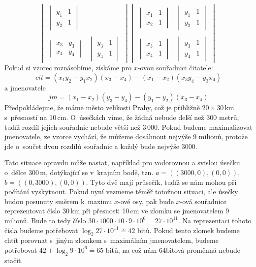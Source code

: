 $${\begin{vmatrix}
		\begin{vmatrix} y_1 & 1\\y_2 & 1\end{vmatrix} \\\\
		\begin{vmatrix} x_3 & y_3\\x_4 & y_4\end{vmatrix} &
		\begin{vmatrix} y_3 & 1\\y_4 & 1\end{vmatrix} 
	\end{vmatrix} 
}
{
	\begin{vmatrix}
		\begin{vmatrix} x_1 & 1\\x_2 & 1\end{vmatrix} &
		\begin{vmatrix} y_1 & 1\\y_2 & 1\end{vmatrix} \\\\
		\begin{vmatrix} x_3 & 1\\x_4 & 1\end{vmatrix} &
		\begin{vmatrix} y_3 & 1\\y_4 & 1\end{vmatrix} 
	\end{vmatrix}
}\,\!$$
Pokud si vzorec roznásobíme, získáme pro $x$-ovou souřadnici čitatele:
$$
{cit = (x_1 y_2-y_1 x_2)(x_3-x_4)-(x_1-x_2)(x_3 y_4-y_3 x_4)}
$$ a jmenovatele $$
{jm = (x_1-x_2)(y_3-y_4)-(y_1-y_2)(x_3-x_4)}$$
Předpokládejme, že máme město velikosti Prahy, což je přibližně $20 \times
30$\,km s~přesností na 10\,cm. O~úsečkách víme, že žádná nebude delší než 300
metrů, tudíž rozdíl jejich souřadnic nebude větší než 3\,000. Pokud budeme
maximalizovat jmenovatele, ze vzorce vychází, že můžeme dosáhnout nejvýše 9
milionů, protože jde o~součet dvou rozdílů souřadnic a každý bude nejvýše 3000.

Tato situace opravdu může nastat, například pro vodorovnou a svislou úsečku
o~délce 300\,m, dotýkající se v~krajním bodě, tzn. $a=((3000,0),(0,0))$,
$b=((0,3000),(0,0))$. Tyto dvě mají průsečík, tudíž se nám mohou při počítání
vyskytnout. Pokud nyní vezmeme téměř totožnou situaci, ale úsečky budou posunuty
směrem k~maximu $x$-ové osy, pak bude $x$-ová souřadnice reprezentovat číslo
30\,km při přesnosti 10\,cm ve zlomku se jmenovatelem 9 milionů. Bude to tedy
číslo $30\cdot1000\cdot10\cdot9\cdot10^6=27 \cdot 10^{11}$. Na reprezentaci tohoto
čísla budeme potřebovat $\log_2 27\cdot 10^{11} \doteq 42$ bitů. Pokud tento
zlomek budeme chtít porovnat s~jiným zlomkem s~maximálním jmenovatelem, budeme
potřebovat $42 + \log_2 9\cdot 10^{6} \doteq 65$ bitů, na což nám 64bitová proměnná
nebude stačit.

